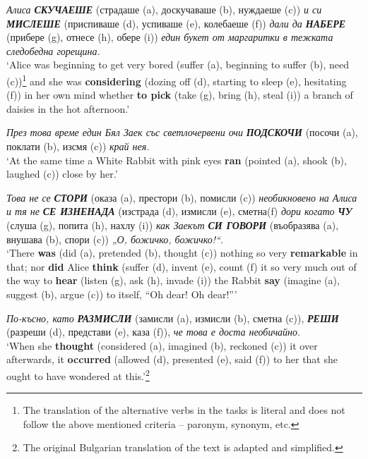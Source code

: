 \documentclass[output=paper,colorlinks,citecolor=brown]{langscibook}
\begin{document}
\largerpage
\begin{exe}  
\ex \label{bg:diff-vb1}
\textit{Алиса \textbf{\uppercase{скучаеше}}} (страдаше (a), доскучаваше (b), нуждаеше (c)) \textit{и си \textbf{\uppercase{мислеше}}} (приспиваше (d), успиваше (e), колебаеше (f)) \textit{дали да \textbf{\uppercase{набере}}} (прибере (g), отнесе (h), обере (i)) \textit{един букет от маргаритки в тежката следобедна горещина.}\\[-0.8em]
\glt `Alice was beginning to get very bored (suffer (a), beginning to suffer (b), need (c))\footnote{The translation of the alternative verbs in the tasks is literal and does not follow the above mentioned criteria -- paronym, synonym, etc.} and she was \textbf{considering} (dozing off (d), starting to sleep (e), hesitating (f)) in her own mind whether \textbf{to pick} (take (g), bring (h), steal (i)) a branch of daisies in the hot afternoon.' 
   
\ex \label{bg:diff-vb2}
\textit{През това време един Бял Заек със светлочервени очи} \textit{\textbf{\uppercase{подскочи}}} (посочи (a), поклати (b), изсмя (c)) \textit{край нея.} 
\\[-0.8em]
\glt `At the same time a White Rabbit with pink eyes \textbf{ran} (pointed (a), shook (b), laughed (c)) close by her.'
   
\ex \label{bg:diff-vb3}
\textit{Това не се} \textit{\textbf{\uppercase{стори}}} (оказа (a), престори (b), помисли (c)) \textit{необикновено на Алиса и тя не} \textit{\textbf{\uppercase{се изненада}}} (изстрада (d), измисли (e), сметна(f) \textit{дори когато} \textit{\textbf{\uppercase{чу}}} (слуша (g), попита (h), нахлу (i)) \textit{как Заекът} \textit{\textbf{\uppercase{си гово\-ри}}} (въобразява (a), внушава (b), спори (c)) \textit{„О, божичко, божичко!“}. 
\\[-0.8em]
\glt `There \textbf{was} (did (a), pretended (b), thought (c)) nothing so very \textbf{remarkable} in that; nor \textbf{did} Alice \textbf{think} (suffer (d), invent (e), count (f) it so very much out of the way to \textbf{hear} (listen (g), ask (h), invade (i)) the Rabbit \textbf{say} (imagine (a), suggest (b), argue (c)) to itself, ``Oh dear! Oh dear!'''
 
\ex \label{bg:diff-vb4}
\textit{По-късно, като} \textit{\textbf{\uppercase{размисли}}} (замисли (a), измисли (b), сметна (c)), \textit{\textbf{\uppercase{реши}}} (разреши (d), представи (e), каза (f)), \textit{че това е доста необичай\-но}. 
\\[-0.8em]
\glt `When she \textbf{thought} (considered (a), imagined (b), reckoned (c)) it over afterwards, it \textbf{occurred} (allowed (d), presented (e), said (f)) to her that she ought to have wondered at this.'\footnote{The original Bulgarian translation of the text is adapted and simplified.}
\end{exe}
\end{document}
